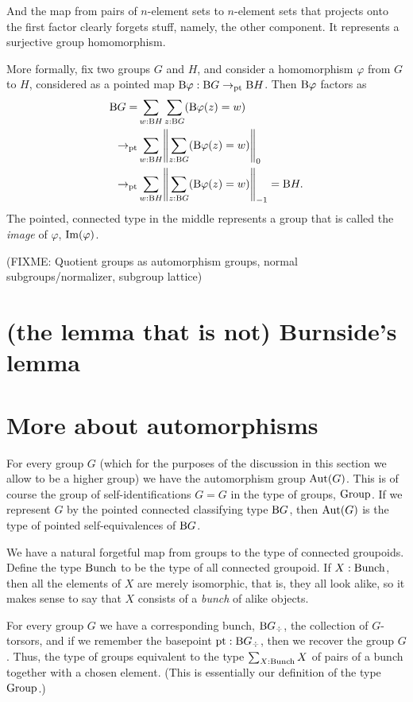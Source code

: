 And the map from pairs of $n$-element sets to $n$-element sets
that projects onto the first factor clearly forgets stuff,
namely, the other component.
It represents a surjective group homomorphism.

More formally, fix two groups $G$ and $H$,
and consider a homomorphism $\varphi$ from $G$ to $H$,
considered as a pointed map $\mathrm B\varphi : \mathrm B G \to_{\mathord{\mathrm{pt}}} \mathrm B H$.
Then $\mathrm B\varphi$ factors as
\begin{align*}
  \B G
  = &\sum_{w:\B H}\sum_{z:\B G}(\B\varphi(z)=w)\\
  \to_\pt &\sum_{w:\B H}\Trunc*{\sum_{z:\B G}(\B\varphi(z)=w)}_0\\
  \to_\pt &\sum_{w:\B H}\Trunc*{\sum_{z:\B G}(\B\varphi(z)=w)}_{-1} = \B H.
\end{align*}
The pointed, connected type in the middle represents a group
that is called the \emph{image} of $\varphi$, $\operatorname{Im}(\varphi)$.

(FIXME: Quotient groups as automorphism groups, normal subgroups/normalizer, subgroup lattice)


\section{(the lemma that is not) Burnside's lemma}
\label{sec:burnsides-lemma}

\section{More about automorphisms}
\label{sec:automorphisms}

For every group $G$ (which for the purposes of the discussion
in this section we allow to be a higher group)
we have the automorphism group $\operatorname{Aut}(G)$.
This is of course the group of self-identifications $G = G$ in the type of groups, $\mathord{\mathrm{Group}}$.
If we represent $G$ by the pointed connected classifying type $\mathrm B G$,
then $\operatorname{Aut}(G)$ is the type of pointed self-equivalences of $\mathrm B G$.

We have a natural forgetful map from groups to the type of connected groupoids.
Define the type $\mathord{\mathrm{Bunch}}$ to be the type of all connected groupoid.
If $X:\mathord{\mathrm{Bunch}}$, then all the elements of $X$ are merely isomorphic,
that is, they all look alike,
so it makes sense to say that $X$ consists of a \emph{bunch} of alike objects.

For every group $G$ we have a corresponding bunch, $\mathrm B G_\div$,
\ie{} the collection of $G$-torsors,
and if we remember the basepoint ${\mathord{\mathrm{pt}}} : \mathrm B G_\div$,
then we recover the group $G$.
Thus, the type of groups equivalent to the type
$\sum_{X : \mathord{\mathrm{Bunch}}} X$
of pairs of a bunch together with a chosen element.
(This is essentially our definition of the type $\mathord{\mathrm{Group}}$.)

